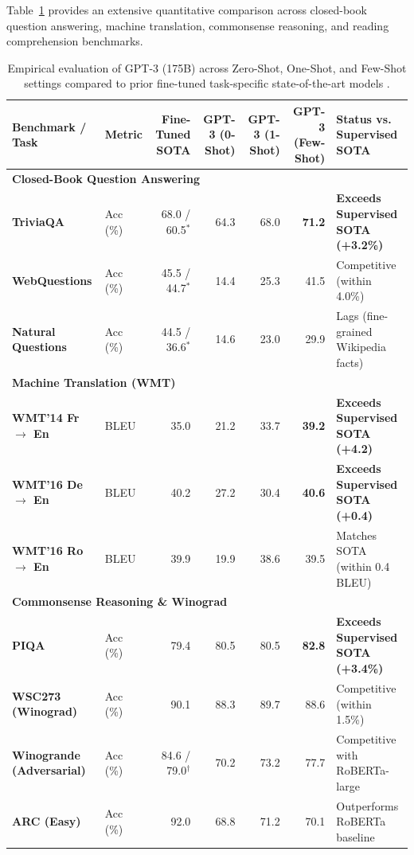 \documentclass[../../../main.tex]{subfiles}
\begin{document}
Table~\ref{tab:gpt3_vs_sota} provides an extensive quantitative comparison across closed-book question answering, machine translation, commonsense reasoning, and reading comprehension benchmarks.

\begin{table}[t]
\centering
\small
\caption{Empirical evaluation of GPT-3 (175B) across Zero-Shot, One-Shot, and Few-Shot settings compared to prior fine-tuned task-specific state-of-the-art models \cite{brown2020}.}
\label{tab:gpt3_vs_sota}
\begin{tabularx}{\textwidth}{l l r r r r X}
\toprule
\textbf{Benchmark / Task} & \textbf{Metric} & \textbf{Fine-Tuned SOTA} & \textbf{GPT-3 (0-Shot)} & \textbf{GPT-3 (1-Shot)} & \textbf{GPT-3 (Few-Shot)} & \textbf{Status vs. Supervised SOTA} \\
\midrule
\multicolumn{7}{l}{\textbf{Closed-Book Question Answering}} \\
\textbf{TriviaQA} & Acc (\%) & 68.0 / 60.5$^*$ & 64.3 & 68.0 & \textbf{71.2} & \textbf{Exceeds Supervised SOTA (+3.2\%)} \\
\textbf{WebQuestions} & Acc (\%) & 45.5 / 44.7$^*$ & 14.4 & 25.3 & 41.5 & Competitive (within 4.0\%) \\
\textbf{Natural Questions} & Acc (\%) & 44.5 / 36.6$^*$ & 14.6 & 23.0 & 29.9 & Lags (fine-grained Wikipedia facts) \\
\midrule
\multicolumn{7}{l}{\textbf{Machine Translation (WMT)}} \\
\textbf{WMT'14 Fr $\to$ En} & BLEU & 35.0 & 21.2 & 33.7 & \textbf{39.2} & \textbf{Exceeds Supervised SOTA (+4.2)} \\
\textbf{WMT'16 De $\to$ En} & BLEU & 40.2 & 27.2 & 30.4 & \textbf{40.6} & \textbf{Exceeds Supervised SOTA (+0.4)} \\
\textbf{WMT'16 Ro $\to$ En} & BLEU & 39.9 & 19.9 & 38.6 & 39.5 & Matches SOTA (within 0.4 BLEU) \\
\midrule
\multicolumn{7}{l}{\textbf{Commonsense Reasoning \& Winograd}} \\
\textbf{PIQA} & Acc (\%) & 79.4 & 80.5 & 80.5 & \textbf{82.8} & \textbf{Exceeds Supervised SOTA (+3.4\%)} \\
\textbf{WSC273 (Winograd)} & Acc (\%) & 90.1 & 88.3 & 89.7 & 88.6 & Competitive (within 1.5\%) \\
\textbf{Winogrande (Adversarial)} & Acc (\%) & 84.6 / 79.0$^\dagger$ & 70.2 & 73.2 & 77.7 & Competitive with RoBERTa-large \\
\textbf{ARC (Easy)} & Acc (\%) & 92.0 & 68.8 & 71.2 & 70.1 & Outperforms RoBERTa baseline \\

\end{tabularx}
\end{table}
\end{document}
